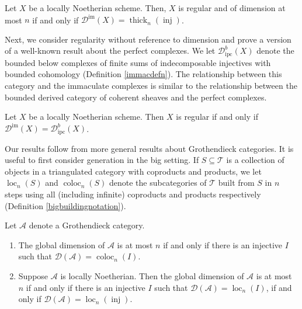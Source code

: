 \documentclass[12pt,oneside]{amsart}
\DeclareMathOperator{\coloc}{coloc}
\DeclareMathOperator{\loc}{loc}
\DeclareMathOperator{\thick}{thick}
\DeclareMathOperator{\inj}{inj}
\DeclareMathOperator{\immac}{im}
\DeclareMathOperator{\ipscoh}{ipc}
\begin{document}
\begin{theorem} \label{introregularscheme1} Let $X$ be a locally Noetherian scheme. Then, $X$ is regular and of dimension at most $n$ if and only if $\mathcal{D}^{\immac}(X) = \thick_n(\inj)$.
\end{theorem}

Next, we consider regularity without reference to dimension and prove a version of a well-known result about the perfect complexes. We let $\mathcal{D}^b_{\ipscoh}(X)$ denote the bounded below complexes of finite sums of indecomposable injectives with bounded cohomology (Definition \ref{immacdefn}). The relationship between this category and the immaculate complexes is similar to the relationship between the bounded derived category of coherent sheaves and the perfect complexes.

\begin{theorem} \label{introregularscheme2}Let $X$ be a locally Noetherian scheme. Then $X$ is regular if and only if $\mathcal{D}^{\immac}(X) = \mathcal{D}^b_{\ipscoh}(X)$.
\end{theorem}

Our results follow from more general results about Grothendieck categories. It is useful to first consider generation in the big setting. If $S \subseteq \mathcal{T}$ is a collection of objects in a triangulated category with coproducts and products, we let $\loc_n(S)$ and $ \coloc_n(S)$ denote the subcategories of $\mathcal{T}$ built from $S$ in $n$ steps using all (including infinite) coproducts and products respectively (Definition \ref{bigbuildingnotation}). 

\begin{theorem} \label{introbigglobdim} Let $\mathcal{A}$ denote a Grothendieck category. 
\begin{enumerate}
\item The global dimension of $\mathcal{A}$ is at most $n$ if and only if there is an injective $I$ such that $\mathcal{D}(\mathcal{A}) = \coloc_n(I)$.

\item Suppose $\mathcal{A}$ is locally Noetherian. Then the global dimension of $\mathcal{A}$ is at most $n$ if and only if there is an injective $I$ such that $\mathcal{D}(\mathcal{A}) = \loc_n(I)$, if and only if $\mathcal{D}(\mathcal{A}) = \loc_n(\inj)$. 
\end{enumerate}
\end{theorem}
\end{document}
